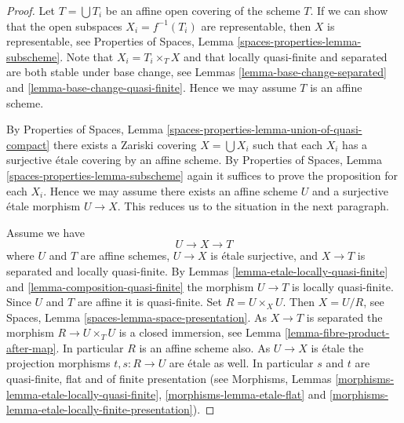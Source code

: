 \documentclass[10pt,a4paper]{amsart}
\theoremstyle{plain}
\theoremstyle{definition}
\theoremstyle{remark}
\numberwithin{equation}{subsection}
\begin{document}
\begin{proof}
Let $T = \bigcup T_i$ be an affine open covering of the scheme $T$.
If we can show that the open subspaces $X_i = f^{-1}(T_i)$ are
representable, then $X$ is representable, see
Properties of Spaces, Lemma \ref{spaces-properties-lemma-subscheme}.
Note that $X_i = T_i \times_T X$ and that locally quasi-finite and
separated are both stable under base change, see
Lemmas \ref{lemma-base-change-separated} and
\ref{lemma-base-change-quasi-finite}.
Hence we may assume $T$ is an affine scheme.

\medskip\noindent
By
Properties of Spaces,
Lemma \ref{spaces-properties-lemma-union-of-quasi-compact}
there exists a Zariski covering $X = \bigcup X_i$
such that each $X_i$ has a surjective \'etale covering by
an affine scheme. By
Properties of Spaces, Lemma \ref{spaces-properties-lemma-subscheme}
again it suffices to prove the proposition for each $X_i$.
Hence we may assume there exists an affine scheme $U$ and a
surjective \'etale morphism $U \to X$. This reduces us to the
situation in the next paragraph.

\medskip\noindent
Assume we have
$$
U \longrightarrow X \longrightarrow T
$$
where $U$ and $T$ are affine schemes, $U \to X$ is \'etale surjective, and
$X \to T$ is separated and locally quasi-finite. By
Lemmas \ref{lemma-etale-locally-quasi-finite} and
\ref{lemma-composition-quasi-finite}
the morphism $U \to T$ is locally quasi-finite.
Since $U$ and $T$ are affine it is quasi-finite.
Set $R = U \times_X U$. Then $X = U/R$, see
Spaces, Lemma \ref{spaces-lemma-space-presentation}.
As $X \to T$ is separated the
morphism $R \to U \times_T U$ is a closed immersion, see
Lemma \ref{lemma-fibre-product-after-map}.
In particular $R$ is an affine scheme also.
As $U \to X$ is \'etale the projection morphisms
$t, s : R \to U$ are \'etale as well. In particular $s$ and $t$ are
quasi-finite, flat and of finite presentation (see
Morphisms, Lemmas \ref{morphisms-lemma-etale-locally-quasi-finite},
\ref{morphisms-lemma-etale-flat} and
\ref{morphisms-lemma-etale-locally-finite-presentation}).


\end{proof}
\end{document}

